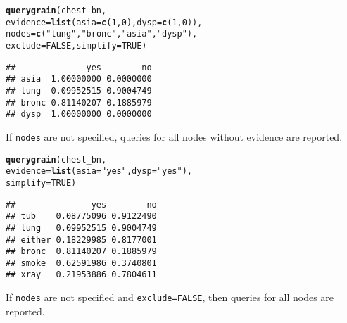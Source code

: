 \documentclass[10pt]{article}\usepackage[]{graphicx}\usepackage[]{xcolor}
\makeatletter
\newcommand{\hlnum}[1]{\textcolor[rgb]{0.686,0.059,0.569}{#1}}%
\newcommand{\hlstr}[1]{\textcolor[rgb]{0.192,0.494,0.8}{#1}}%
\newcommand{\hlstd}[1]{\textcolor[rgb]{0.345,0.345,0.345}{#1}}%
\newcommand{\hlkwc}[1]{\textcolor[rgb]{0.333,0.667,0.333}{#1}}%
\newcommand{\hlkwd}[1]{\textcolor[rgb]{0.737,0.353,0.396}{\textbf{#1}}}%
\newenvironment{kframe}{%
 \def\at@end@of@kframe{}%
 \ifinner\ifhmode%
  \def\at@end@of@kframe{\end{minipage}}%
  \begin{minipage}{\columnwidth}%
 \fi\fi%
 \def\FrameCommand##1{\hskip\@totalleftmargin \hskip-\fboxsep
 \colorbox{shadecolor}{##1}\hskip-\fboxsep
     \hskip-\linewidth \hskip-\@totalleftmargin \hskip\columnwidth}%
 \MakeFramed {\advance\hsize-\width
   \@totalleftmargin\z@ \linewidth\hsize
   \@setminipage}}%
 {\par\unskip\endMakeFramed%
 \at@end@of@kframe}
\newenvironment{knitrout}{}{} %
\def\code#1{{\texttt{#1}}}
\makeatother
\begin{document}
\begin{enumerate}
\begin{knitrout}
\color{fgcolor}\begin{kframe}
\begin{alltt}
\hlkwd{querygrain}\hlstd{(chest_bn,}
           \hlkwc{evidence}\hlstd{=}\hlkwd{list}\hlstd{(}\hlkwc{asia}\hlstd{=}\hlkwd{c}\hlstd{(}\hlnum{1}\hlstd{,} \hlnum{0}\hlstd{),} \hlkwc{dysp}\hlstd{=}\hlkwd{c}\hlstd{(}\hlnum{1}\hlstd{,} \hlnum{0}\hlstd{)),}
           \hlkwc{nodes}\hlstd{=}\hlkwd{c}\hlstd{(}\hlstr{"lung"}\hlstd{,} \hlstr{"bronc"}\hlstd{,} \hlstr{"asia"}\hlstd{,} \hlstr{"dysp"}\hlstd{),}
           \hlkwc{exclude}\hlstd{=}\hlnum{FALSE}\hlstd{,} \hlkwc{simplify} \hlstd{=} \hlnum{TRUE}\hlstd{)}
\end{alltt}
\begin{verbatim}
##              yes        no
## asia  1.00000000 0.0000000
## lung  0.09952515 0.9004749
## bronc 0.81140207 0.1885979
## dysp  1.00000000 0.0000000
\end{verbatim}
\end{kframe}
\end{knitrout}



If \code{nodes} are not specified, queries for all nodes without evidence are reported.
\begin{knitrout}
\color{fgcolor}\begin{kframe}
\begin{alltt}
\hlkwd{querygrain}\hlstd{(chest_bn,}
           \hlkwc{evidence}\hlstd{=}\hlkwd{list}\hlstd{(}\hlkwc{asia}\hlstd{=}\hlstr{"yes"}\hlstd{,} \hlkwc{dysp}\hlstd{=}\hlstr{"yes"}\hlstd{),}
           \hlkwc{simplify} \hlstd{=} \hlnum{TRUE}\hlstd{)}
\end{alltt}
\begin{verbatim}
##               yes        no
## tub    0.08775096 0.9122490
## lung   0.09952515 0.9004749
## either 0.18229985 0.8177001
## bronc  0.81140207 0.1885979
## smoke  0.62591986 0.3740801
## xray   0.21953886 0.7804611
\end{verbatim}
\end{kframe}
\end{knitrout}

If \code{nodes} are not specified and \code{exclude=FALSE}, then queries for all nodes are reported.


\end{enumerate}
\end{document}
